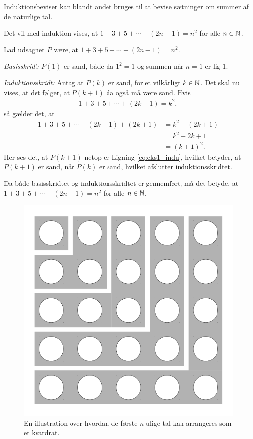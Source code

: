 Induktionsbeviser kan blandt andet bruges til at bevise sætninger om summer af de naturlige tal.
\begin{exmp}
	Det vil med induktion vises, at $1 + 3 + 5 + \dotsb + (2n-1) = n^2$ for alle $n \in \mathbb{N}$.

	Lad udsagnet $P$ være, at $1 + 3 + 5 + \dotsb + (2n-1) = n^2$.
	
	\textit{Basisskridt:} $P(1)$ er sand, både da $1^2 = 1$ og summen når $n = 1$ er lig $1$.

	\textit{Induktionsskridt:} Antag at $P(k)$ er sand, for et vilkårligt $k \in \mathbb{N}$.
	Det skal nu vises, at det følger, at $P(k + 1)$ da også må være sand. 
	Hvis
	\begin{align}
		1 + 3 + 5 + \dotsb + (2k-1) 
		= k^2, \nonumber
	\end{align}
	så gælder det, at
	\begin{align}
		1 + 3 + 5 + \dotsb + (2k-1) + (2k+1) 
		&= k^2 + (2k + 1) \nonumber \\
		&= k^2 + 2k + 1 \nonumber \\
		&= \left( k + 1 \right) ^2. \label{eq:eks1_indu}
	\end{align}
	Her ses det, at $P(k + 1)$ netop er Ligning \eqref{eq:eks1_indu}, hvilket betyder, at $P(k + 1)$ er sand, når $P(k)$ er sand, hvilket afslutter induktionsskridtet.

	Da både basisskridtet og induktionsskridtet er gennemført, må det betyde, at $1 + 3 + 5 + \dotsb + (2n-1) = n^2$ for alle $n \in \mathbb{N}$.
\end{exmp}

\begin{figure}
	\centering
	\includegraphics[scale=0.21]{fig/img/sum_of_n_first_odd_integers.png}
	\caption{En illustration over hvordan de første $n$ ulige tal kan arrangeres som et kvardrat.} \label{fig1_indu}
\end{figure}

